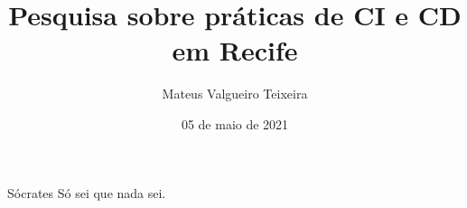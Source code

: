 \documentclass[bsc, oneside]{ufpethesis}
\institute{Centro de Informática}
\title{Pesquisa sobre práticas de CI e CD em Recife}
\date{05 de maio de 2021}
\author{Mateus Valgueiro Teixeira}
\begin{document}
\frontmatter

\frontpage

\presentationpage





\begin{epigraph}[]{Sócrates}
Só sei que nada sei.
\end{epigraph}






\tableofcontents

\listoffigures


\mainmatter

% 
% 
% 







\backmatter

\appendix






\nocite{*}




\end{document}
